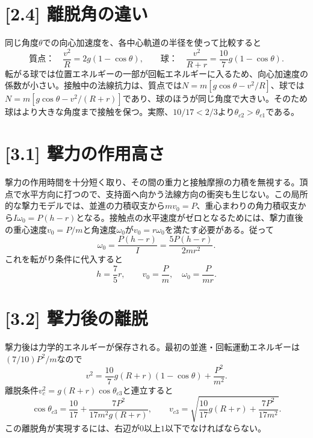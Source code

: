 \documentclass[11pt,a4paper]{article}
\begin{document}
\section*{[2.4] 離脱角の違い}
同じ角度$\theta$での向心加速度を、各中心軌道の半径を使って比較すると
\begin{equation}
 \text{質点：}\quad\frac{v^2}{R}=2g(1-\cos\theta),\qquad
 \text{球：}\quad\frac{v^2}{R+r}=\frac{10}{7}g(1-\cos\theta).
\end{equation}
転がる球では位置エネルギーの一部が回転エネルギーに入るため、向心加速度の係数が小さい。接触中の法線抗力は、質点では$N=m[g\cos\theta-v^2/R]$、球では$N=m[g\cos\theta-v^2/(R+r)]$であり、球のほうが同じ角度で大きい。そのため球はより大きな角度まで接触を保つ。実際、$10/17<2/3$より$\theta_{c2}>\theta_{c1}$である。

\section*{[3.1] 撃力の作用高さ}
撃力の作用時間を十分短く取り、その間の重力と接触摩擦の力積を無視する。頂点で水平方向に打つので、支持面へ向かう法線方向の衝突も生じない。この局所的な撃力モデルでは、並進の力積収支から$mv_0=P$、重心まわりの角力積収支から$I\omega_0=P(h-r)$となる。接触点の水平速度がゼロとなるためには、撃力直後の重心速度$v_0=P/m$と角速度$\omega_0$が$v_0=r\omega_0$を満たす必要がある。従って
\begin{equation}
 \omega_0=\frac{P(h-r)}{I}=\frac{5P(h-r)}{2mr^2}.
\end{equation}
これを転がり条件に代入すると
\begin{equation}
 \boxed{h=\frac75r},\qquad v_0=\frac{P}{m},\quad \omega_0=\frac{P}{mr}.
\end{equation}

\section*{[3.2] 撃力後の離脱}
撃力後は力学的エネルギーが保存される。最初の並進・回転運動エネルギーは$(7/10)P^2/m$なので
\begin{equation}
 v^2=\frac{10}{7}g(R+r)(1-\cos\theta)+\frac{P^2}{m^2}.
\end{equation}
離脱条件$v_c^2=g(R+r)\cos\theta_{c3}$と連立すると
\begin{equation}
 \boxed{\cos\theta_{c3}=\frac{10}{17}
 +\frac{7P^2}{17m^2g(R+r)}},\qquad
 \boxed{v_{c3}=\sqrt{\frac{10}{17}g(R+r)+\frac{7P^2}{17m^2}}}.
\end{equation}
この離脱角が実現するには、右辺が$0$以上$1$以下でなければならない。
\end{document}
